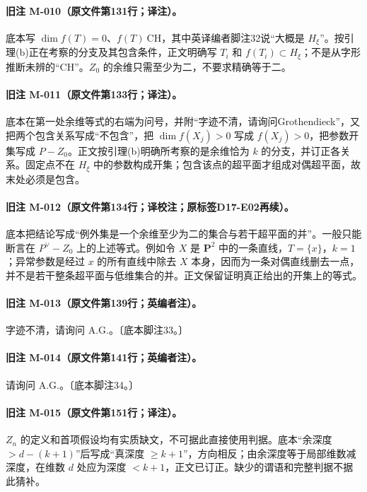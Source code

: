 \paragraph{旧注 M-010（原文件第131行；译注）。}
底本写 $\dim f(T)=0$、$f(T)\ \mathrm{CH}$，其中英译编者脚注32说“大概是 $H_\xi$”。按引理(b)正在考察的分支及其包含条件，正文明确写 $T_i$ 和 $f(T_i)\subset H_\xi$；不是从字形推断未辨的“CH”。$Z_0$ 的余维只需至少为二，不要求精确等于二。

\paragraph{旧注 M-011（原文件第133行；译注）。}
底本在第一处余维等式的右端为问号，并附“字迹不清，请询问Grothendieck”，又把两个包含关系写成“不包含”，把 $\dim f(X_j)>0$ 写成 $f(X_j)>0$，把参数开集写成 $P-Z_0$。正文按引理(b)明确所考察的是余维恰为 $k$ 的分支，并订正各关系。固定点不在 $H_\xi$ 中的参数构成开集；包含该点的超平面才组成对偶超平面，故末处必须是包含。

\paragraph{旧注 M-012（原文件第134行；译校注；原标签D17-E02再续）。}
底本把结论写成“例外集是一个余维至少为二的集合与若干超平面的并”。一般只能断言在 $P^\vee-Z_0$ 上的上述等式。例如令 $X$ 是 $\mathbf P^2$ 中的一条直线，$T=\{x\}$，$k=1$；异常参数是经过 $x$ 的所有直线中除去 $X$ 本身，因而为一条对偶直线删去一点，并不是若干整条超平面与低维集合的并。正文保留证明真正给出的开集上的等式。

\paragraph{旧注 M-013（原文件第139行；英编者注）。}
字迹不清，请询问 A.G.。〔底本脚注33。〕

\paragraph{旧注 M-014（原文件第141行；英编者注）。}
请询问 A.G.。〔底本脚注34。〕

\paragraph{旧注 M-015（原文件第151行；译注）。}
$Z_n$ 的定义和首项假设均有实质缺文，不可据此直接使用判据。底本“余深度 $>d-(k+1)$”后写成“真深度 $\geq k+1$”，方向相反；由余深度等于局部维数减深度，在维数 $d$ 处应为深度 $<k+1$，正文已订正。缺少的谓语和完整判据不据此猜补。

